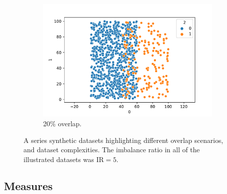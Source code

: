 \begin{figure}
\begin{subfigure}[b]{0.24\textwidth}
    \end{subfigure}
    \hfill
    \begin{subfigure}[b]{0.24\textwidth}  
        \centering 
        \includegraphics[width=\textwidth]{plots/synthetic_dataset_visualizations/uniform_overlap_0.83_0.17_20_1000.csv.pdf}
        \caption[]%
        {{\small 20\% overlap.}}    
        \label{fig:uniform_overlap_20}
    \end{subfigure}
    \caption[]
    {\small A series synthetic datasets highlighting different overlap scenarios, and dataset complexities. The imbalance ratio in all of the illustrated datasets was $\text{IR}=5$.} 
    \label{fig:mean and std of nets}
\end{figure}

\subsection{Measures}
